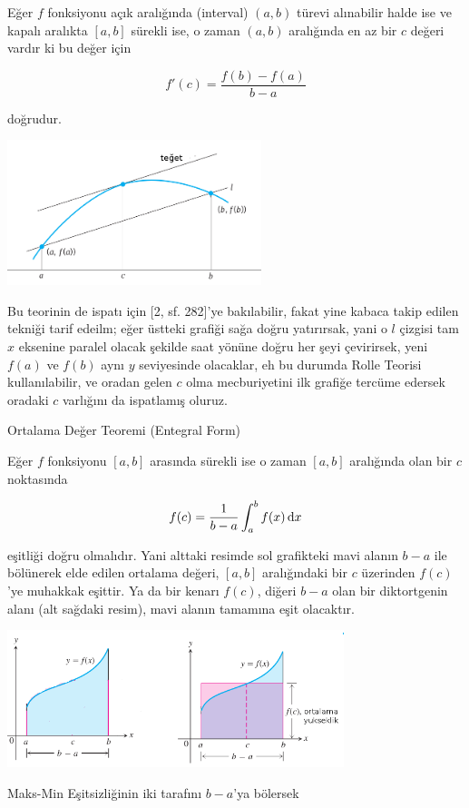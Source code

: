 \documentclass[12pt,fleqn]{article}\usepackage{../../common}
\begin{document}
Eğer $f$ fonksiyonu açık aralığında (interval) $(a,b)$ türevi alınabilir halde
ise ve kapalı aralıkta $[a,b]$ sürekli ise, o zaman $(a,b)$ aralığında
en az bir $c$ değeri vardır ki bu değer için

$$
f'(c) = \frac{f(b) - f(a)}{b-a}
$$

doğrudur.

\includegraphics[width=20em]{calc_multi_app_01.png}

Bu teorinin de ispatı için [2, sf. 282]'ye bakılabilir, fakat yine kabaca takip
edilen tekniği tarif edeilm; eğer üstteki grafiği sağa doğru yatırırsak, yani o
$l$ çizgisi tam $x$ eksenine paralel olacak şekilde saat yönüne doğru her şeyi
çevirirsek, yeni $f(a)$ ve $f(b)$ aynı $y$ seviyesinde olacaklar, eh bu durumda
Rolle Teorisi kullanılabilir, ve oradan gelen $c$ olma mecburiyetini ilk
grafiğe tercüme edersek oradaki $c$ varlığını da ispatlamış oluruz. 

Ortalama Değer Teoremi (Entegral Form)

Eğer $f$ fonksiyonu $[a,b]$ arasında sürekli ise o zaman $[a,b]$ aralığında
olan bir $c$ noktasında

$$ f(c) = \frac{1}{b-a}\int_a^b f(x) \,\mathrm{d} x $$

eşitliği doğru olmalıdır. Yani alttaki resimde sol grafikteki mavi alanın
$b-a$ ile bölünerek elde edilen ortalama değeri, $[a,b]$ aralığındaki bir
$c$ üzerinden $f(c)$'ye muhakkak eşittir. Ya da bir kenarı $f(c)$, diğeri
$b-a$ olan bir diktortgenin alanı (alt sağdaki resim), mavi alanın
tamamına eşit olacaktır.

\includegraphics[height=4cm]{calc_multi_app_07.png}

Maks-Min Eşitsizliğinin iki tarafını $b-a$'ya bölersek
\end{document}
